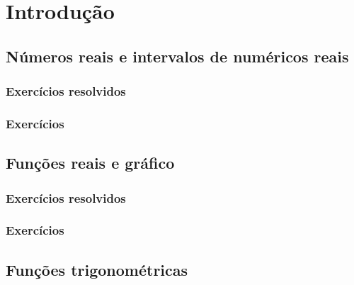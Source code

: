 
\chapter{Introdução}\label{chap:introducao}
\emconstrucao

\section{Números reais e intervalos de numéricos reais}\label{sec:intro_reais}
\construirSec

\subsection*{Exercícios resolvidos}

\construirExeresol


\subsection*{Exercícios}

\construirExer


\section{Funções reais e gráfico}\label{sec:intro_fun_reais}
\construirSec

\subsection*{Exercícios resolvidos}

\construirExeresol


\subsection*{Exercícios}

\construirExer


\section{Funções trigonométricas}\label{sec:intro_trigo}
\construirSec

